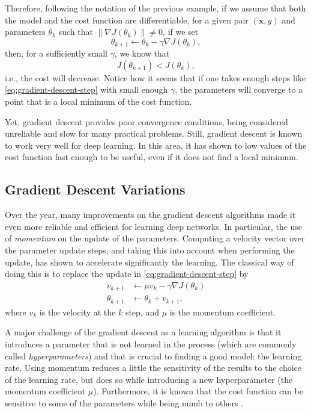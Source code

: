 Therefore, following the notation of the previous example, if we assume that both the model and the cost function are differentiable, for a given pair $(\bm{x},y)$ and parameters $\theta_k$ such that $\| \nabla J(\theta_k) \| \neq 0$, if we set
\begin{equation}\label{eq:gradient-descent-step}
\theta_{k+1} \gets \theta_k - \gamma \nabla J(\theta_k) 
,\end{equation}
then, for a sufficiently small $\gamma$, we know that \[
J\left( \theta_{k+1} \right) < J\left( \theta_k \right) 
,\] i.e., the cost will decrease.
Notice how it seems that if one takes enough steps like \eqref{eq:gradient-descent-step} with small enough $\gamma$, the parameters will converge to a point that is a local minimum of the cost function.


Yet, gradient descent provides poor convergence conditions\cite{wolfe_convergence_1969}, being considered unreliable and slow for many practical problems.
Still, gradient descent is known to work very well for deep learning.
In this area, it has shown to low values of the cost function fast enough to be useful, even if it does not find a local minimum.
\cite{goodfellow_deep_2016}

\subsection{Gradient Descent Variations}

Over the year, many improvements on the gradient descent algorithms made it even more reliable and efficient for learning deep networks.
In particular, the use of \textit{momentum} on the update of the parameters.
Computing a velocity vector over the parameter update steps, and taking this into account when performing the update, has shown to accelerate significantly the learning\cite{sutskever_importance_2013}.
The classical way of doing this is to replace the update in \eqref{eq:gradient-descent-step} by
\begin{align*}
    v_{k+1} &\gets \mu v_k - \gamma \nabla J(\theta_k) \\
    \theta_{k+1} &\gets \theta_k + v_{k+1}
,\end{align*}
where $v_k$ is the velocity at the $k$ step, and $\mu$ is the momentum coefficient.

A major challenge of the gradient descent as a learning algorithm is that it introduces a parameter that is not learned in the process (which are commonly called \emph{hyperparameters}) and that is crucial to finding a good model: the learning rate.
Using momentum reduces a little the sensitivity of the results to the choice of the learning rate, but does so while introducing a new hyperparameter (the momentum coefficient $\mu$).
Furthermore, it is known that the cost function can be sensitive to some of the parameters while being numb to others \cite{goodfellow_deep_2016}.


